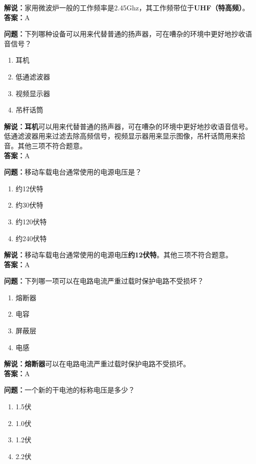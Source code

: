 \textbf{解说：}家用微波炉一般的工作频率是2.45Ghz，其工作频带位于\textbf{UHF（特高频）}。\\\textbf{答案：}A


\textbf{问题：}下列哪种设备可以用来代替普通的扬声器，可在嘈杂的环境中更好地抄收语音信号？

\begin{enumerate}[label=\Alph*), leftmargin=1cm]
	\item 耳机
	\item 低通滤波器
	\item 视频显示器
	\item 吊杆话筒
\end{enumerate}

\textbf{解说：耳机}可以用来代替普通的扬声器，可在嘈杂的环境中更好地抄收语音信号。低通滤波器用来过滤去除高频信号，视频显示器用来显示图像，吊杆话筒用来拾音。其他三项不符合题意。\\\textbf{答案：}A%


\textbf{问题：}移动车载电台通常使用的电源电压是？

\begin{enumerate}[label=\Alph*), leftmargin=1cm]
	\item 约12伏特
	\item 约30伏特
	\item 约120伏特
	\item 约240伏特
\end{enumerate}

\textbf{解说：}移动车载电台通常使用的电源电压\textbf{约12伏特}。其他三项不符合题意。\\\textbf{答案：}A


\textbf{问题：}下列哪一项可以在电路电流严重过载时保护电路不受损坏？

\begin{enumerate}[label=\Alph*), leftmargin=1cm]
	\item 熔断器
	\item 电容
	\item 屏蔽层
	\item 电感
\end{enumerate}

\textbf{解说：熔断器}可以在电路电流严重过载时保护电路不受损坏。\\\textbf{答案：}A%

\textbf{问题：}一个新的干电池的标称电压是多少？

\begin{enumerate}[label=\Alph*), leftmargin=1cm]
	\item 1.5伏
	\item 1.0伏
	\item 1.2伏
	\item 2.2伏
\end{enumerate}


